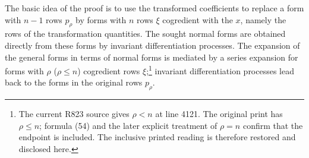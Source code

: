 \documentclass[10pt]{article}
\begin{document}
The basic idea of the proof is to use the transformed coefficients to
replace a form with $n-1$ rows $p_\rho$ by forms with $n$ rows $\xi$
cogredient with the $x$, namely the rows of the transformation quantities.
The sought normal forms are obtained directly from these forms by invariant
differentiation processes. The expansion of the general forms in terms of
normal forms is mediated by a series expansion for forms with $\rho$
($\rho\leq n$) cogredient rows $\xi$;\footnote{The current R823 source gives
$\rho<n$ at line 4121. The original print has $\rho\leq n$; formula (54) and
the later explicit treatment of $\rho=n$ confirm that the endpoint is
included. The inclusive printed reading is therefore restored and disclosed
here.} invariant
differentiation processes lead back to the forms in the original rows
$p_\rho$.
\end{document}
